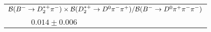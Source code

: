 \begin{center}
\begin{longtable}{| l l l |}
\hline
\multicolumn{3}{|l|}{${{\cal{B}} ( B^- \to D_2^{*+} \pi^- ) \times {\cal{B}} ( D_2^{*+} \to D^0 \pi^- \pi^+ )}/{{\cal{B}} ( B^- \to D^0 \pi^+ \pi^- \pi^- )}$}\\
 & \begin{tabular}{l} LHCb: $0.014 \pm 0.006 \pm 0.002$ \\ \end{tabular} & $0.014 \pm 0.006$ \\
\hline
\end{longtable}
\end{center}
